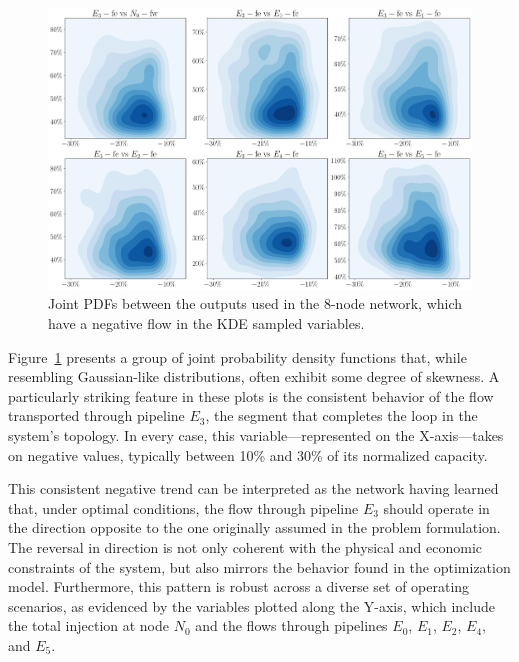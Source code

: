 \begin{figure}
    \begin{center}
        \includegraphics[width=.7\textwidth]{figures/Chapter_NonLinealCensnet/outputs_outputs_2 (KDE).png}
    \end{center}
    \caption{Joint PDFs between the outputs used in the 8-node network, which have a negative flow in the KDE sampled variables.}
    \label{fig:joint_distributions_output_output_2_KDE}
\end{figure}
 

Figure~\ref{fig:joint_distributions_output_output_2_KDE} presents a group of joint probability density functions that, while resembling Gaussian-like distributions, often exhibit some degree of skewness. A particularly striking feature in these plots is the consistent behavior of the flow transported through pipeline $E_3$, the segment that completes the loop in the system’s topology. In every case, this variable—represented on the X-axis—takes on negative values, typically between 10\% and 30\% of its normalized capacity.

This consistent negative trend can be interpreted as the network having learned that, under optimal conditions, the flow through pipeline $E_3$ should operate in the direction opposite to the one originally assumed in the problem formulation. The reversal in direction is not only coherent with the physical and economic constraints of the system, but also mirrors the behavior found in the optimization model. Furthermore, this pattern is robust across a diverse set of operating scenarios, as evidenced by the variables plotted along the Y-axis, which include the total injection at node $N_0$ and the flows through pipelines $E_0$, $E_1$, $E_2$, $E_4$, and $E_5$. 


